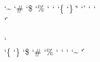 \startcatcodetable \notcatcodes %
    \catcode\tabasciicode       \spacecatcode
    \catcode\endoflineasciicode \endoflinecatcode
    \catcode\formfeedasciicode  \endoflinecatcode
    \catcode\spaceasciicode     \spacecatcode
    \catcode\endoffileasciicode \ignorecatcode
    \catcode\caretasciicode     \othercatcode
    \catcode\underscoreasciicode\othercatcode
    \catcode\ampersandasciicode \othercatcode
    \catcode`\~                 \othercatcode
    \catcode`\#                 \othercatcode
    \catcode`\$                 \othercatcode
    \catcode`\%                 \othercatcode
    \catcode`\<                 \othercatcode
    \catcode`\>                 \othercatcode
    \catcode`\{                 \othercatcode
    \catcode`\}                 \othercatcode
    \catcode`\"                 \othercatcode
    \catcode`\'                 \othercatcode
    \catcode`\/                 \othercatcode
    \catcode`\\                 \othercatcode
    \catcode`\|                 \othercatcode
\stopcatcodetable

\startcatcodetable \vrbcatcodes %
    \catcode\tabasciicode      \othercatcode
    \catcode\endoflineasciicode\othercatcode
    \catcode\formfeedasciicode \othercatcode
    \catcode\spaceasciicode    \othercatcode
    \catcode\endoffileasciicode\othercatcode
\stopcatcodetable

\startcatcodetable \prtcatcodes
    \catcode\tabasciicode       \spacecatcode
    \catcode\endoflineasciicode \endoflinecatcode
    \catcode\formfeedasciicode  \endoflinecatcode
    \catcode\spaceasciicode     \spacecatcode
    \catcode\endoffileasciicode \ignorecatcode
    \catcode\caretasciicode     \superscriptcatcode
    \catcode\underscoreasciicode\subscriptcatcode
    \catcode\ampersandasciicode \alignmentcatcode
    \catcode`\\                 \escapecatcode
    \catcode`\{                 \begingroupcatcode
    \catcode`\}                 \endgroupcatcode
    \catcode`\$                 \mathshiftcatcode
    \catcode`\#                 \parametercatcode
    \catcode`\%                 \commentcatcode
    \catcode`\@                 {}
    \catcode`\!                 
    \catcode`\?                 
    \catcode`\~                 \activecatcode
    \catcode`\|                 \activecatcode
\stopcatcodetable


